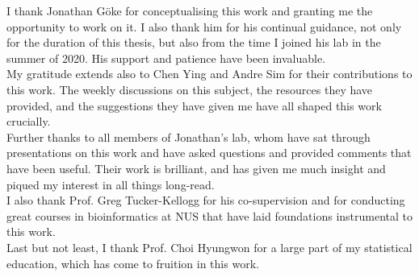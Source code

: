 
I thank Jonathan Göke for conceptualising this work and granting me the opportunity to work on it. I also thank him for his continual guidance, not only for the duration of this thesis, but also from the time I joined his lab in the summer of 2020. His support and patience have been invaluable.\\[10pt]
My gratitude extends also to Chen Ying and Andre Sim for their contributions to this work. The weekly discussions on this subject, the resources they have provided, and the suggestions they have given me have all shaped this work crucially.\\[10pt] 
Further thanks to all members of Jonathan's lab, whom have sat through presentations on this work and have asked questions and provided comments that have been useful. Their work is brilliant, and has given me much insight and piqued my interest in all things long-read.\\[10pt]
I also thank Prof. Greg Tucker-Kellogg for his co-supervision and for conducting great courses in bioinformatics at NUS that have laid foundations instrumental to this work.\\[10pt] 
Last but not least, I thank Prof. Choi Hyungwon for a large part of my statistical education, which has come to fruition in this work.  